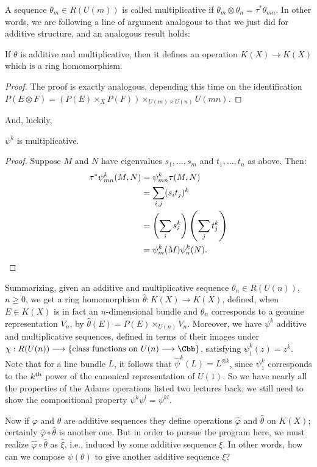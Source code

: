 A sequence $\theta_m \in R(U(m))$ is called multiplicative if $\theta_m \otimes \theta_n = \tau^* \theta_{mn}$.  In other words, we are following a line of argument analogous to that we just did for additive structure, and an analogous result holds:
\begin{thm}
If $\theta$ is additive and multiplicative, then it defines an operation $K(X) \to K(X)$ which is a ring homomorphism.
\end{thm}
\begin{proof}
The proof is exactly analogous, depending this time on the identification $P(E \otimes F) = (P(E) \times_X P(F)) \times_{U(m) \times U(n)} U(mn)$.
\end{proof}

And, luckily,
\begin{lem}
$\psi^k$ is multiplicative.
\end{lem}
\begin{proof}Suppose $M$ and $N$ have eigenvalues $s_1, \ldots, s_m$ and $t_1, \ldots, t_n$ as above. Then:
\begin{align*}
\tau^* \psi^k_{mn}(M, N) & = \psi^k_{mn} \tau(M, N) \\
& = \sum_{i, j}(s_i t_j)^k \\
& = \left( \sum_i s_i^k \right) \left( \sum_j t_j^k \right) \\
& = \psi^k_m(M) \psi^k_n(N).\qedhere
\end{align*}
\end{proof}

Summarizing, given an additive and multiplicative sequence $\theta_n \in R(U(n))$, $n \ge 0$, we get a ring homomorphism $\hat \theta: K(X) \to K(X)$, defined, when $E \in K(X)$ is in fact an $n$-dimensional bundle and $\theta_n$ corresponds to a genuine representation $V_n$, by $\hat \theta(E) = P(E) \times_{U(n)} V_n$.  Moreover, we have $\psi^k$ additive and multiplicative sequences, defined in terms of their images under $\chi: R(U(n)) \to \{\hbox{class functions on $U(n) \to \Cbb$}\}$, satisfying $\psi^k_1(z) = z^k$.  Note that for a line bundle $L$, it follows that $\hat \psi^k(L) = L^{\otimes k}$, since $\psi^k_1$ corresponds to the $k^\textup{th}$ power of the canonical representation of $U(1)$.  So we have nearly all the properties of the Adams operations listed two lectures back; we still need to show the compositional property $\psi^k \psi^l = \psi^{kl}$.

Now if $\varphi$ and $\theta$ are additive sequences they define operations $\hat \varphi$ and $\hat \theta$ on $K(X)$; certainly $\hat \varphi \circ \hat \theta$ is another one.  But in order to pursue the program here, we must realize $\hat \varphi \circ \hat \theta$ as $\hat \xi$, i.e., induced by some additive sequence $\xi$.  In other words, how can we compose $\psi (\theta)$ to give another additive sequence $\xi$?

